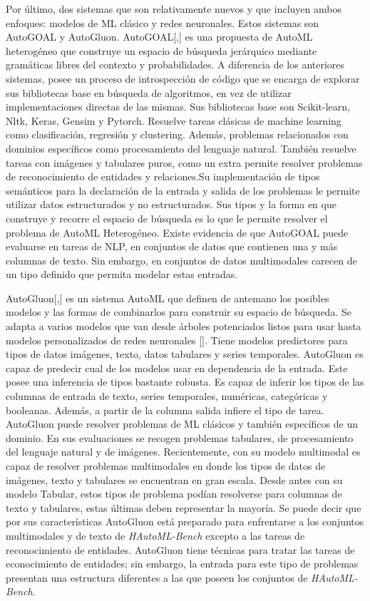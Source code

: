 Por último, dos sistemas que son relativamente nuevos y que incluyen ambos enfoques: modelos de ML clásico y redes neuronales. 
Estos sistemas son AutoGOAL y AutoGluon.
AutoGOAL[\cite{40},\cite{41}] es una propuesta de AutoML heterogéneo que construye un espacio de búsqueda jerárquico mediante gramáticas libres del contexto y 
probabilidades. A diferencia de los anteriores sistemas, posee un proceso de introspección de código que se encarga de explorar sus bibliotecas base en búsqueda de 
algoritmos, en vez de utilizar implementaciones directas de las mismas. Sus bibliotecas base son Scikit-learn, Nltk, Keras, Gensim y Pytorch. Resuelve tareas clásicas 
de machine learning como clasificación, regresión y clustering. Además, problemas relacionados con dominios específicos como procesamiento del lenguaje natural. También 
resuelve tareas con imágenes y tabulares puros, como un extra permite resolver problemas de reconocimiento de entidades y relaciones.Su implementación de tipos 
semánticos para la declaración de la entrada y salida de los problemas le permite utilizar datos estructurados y no estructurados. Sus tipos y la forma en que construye 
y recorre el espacio de búsqueda es lo que le permite resolver el problema de AutoML Heterogéneo. Existe evidencia de que AutoGOAL puede evaluarse en tareas de  NLP, 
en conjuntos de datos que contienen una y más columnas de texto. Sin embargo, en conjuntos de datos multimodales carecen de un tipo definido que permita modelar estas 
entradas.   

AutoGluon[\cite{17},\cite{42}] es un sistema AutoML que definen de antemano los posibles modelos y las formas de combinarlos para construir su espacio de búsqueda.
Se adapta a varios modelos que van desde árboles potenciados listos para usar hasta modelos personalizados de redes neuronales [\cite{37}]. Tiene modelos predictores 
para tipos de datos imágenes, texto, datos tabulares y series temporales. AutoGluon es capaz de predecir cual de los modelos usar en dependencia de la entrada.
Este posee una inferencia de tipos bastante robusta. Es capaz de inferir los tipos de las columnas de entrada de texto, series temporales, numéricas, categóricas y 
booleanas. Además, a partir de la columna salida infiere el tipo de tarea. AutoGluon puede resolver problemas de ML clásicos y también específicos de un dominio. En 
sus evaluaciones se recogen problemas tabulares, de procesamiento del lenguaje natural y de imágenes. Recientemente, con su modelo multimodal es capaz de resolver 
problemas multimodales en donde los tipos de datos de imágenes, texto y tabulares se encuentran en gran escala. Desde antes con su modelo Tabular, estos tipos de 
problema podían resolverse para columnas de texto y tabulares, estas últimas deben representar la mayoría. 
Se puede decir que por sus características AutoGluon está preparado para enfrentarse a los conjuntos multimodales y de texto de \textit{HAutoML-Bench} excepto a las 
tareas de reconocimiento de entidades. AutoGluon tiene técnicas para tratar las tareas de econocimiento de entidades; sin embargo, la entrada para este tipo de problemas
presentan una estructura diferentes a las que poseen los conjuntos de \textit{HAutoML-Bench}.  

